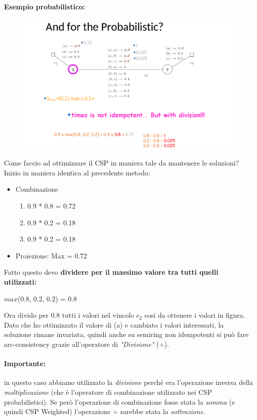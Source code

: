 \textbf{Esempio probabilistico:}

\begin{figure}[H]
    \centering
    \includegraphics[width=14cm, keepaspectratio]{img/Cap5/probabilisticmeglio.png}
\end{figure}

Come faccio ad ottimizzare il CSP in maniera tale da mantenere le soluzioni?
\\Inizio in maniera identica al precedente metodo:
\begin{itemize}
    \item Combinazione
          \begin{enumerate}
              \item 0.9 * 0.8 = 0.72
              \item 0.9 * 0.2 = 0.18
              \item 0.9 * 0.2 = 0.18
          \end{enumerate}
    \item Proiezione: Max = 0.72
\end{itemize}
\noindent Fatto questo devo \textbf{dividere per il massimo valore tra tutti
    quelli utilizzati:}
\begin{center}
    $max$(0.8, 0.2, 0.2) = 0.8
\end{center}
Ora divido per 0.8 tutti i valori nel vincolo $c_2$ cosi da ottenere i valori in
figura. Dato che ho ottimizzato il valore di (a) e cambiato i valori
interessati, la soluzione rimane invariata, quindi anche su semiring non
idempotenti si può fare arc-consistency grazie all'operatore di \textit{"Divisione"}
($\div$).

\paragraph{Importante:} in questo caso abbiamo utilizzato la
\textit{divisione} perché era l'operazione inversa della \textit{moltiplicazione} (che è
l'operatore di combinazione utilizzato nei CSP probabilistici). Se però
l'operazione di combinazione fosse stata la \textit{somma} (e quindi CSP Weighted)
l'operazione $\div$ sarebbe stata la \textit{sottrazione}.
